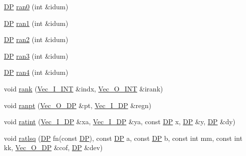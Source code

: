 \begin{DoxyCompactItemize}
\item 
\mbox{\hyperlink{namespaceNR_af6ff762dd605ff477b8e52387253a02a}{DP}} \mbox{\hyperlink{namespaceNR_a51fab0252d34144103c74d4f947e86c1}{ran0}} (int \&idum)
\item 
\mbox{\hyperlink{namespaceNR_af6ff762dd605ff477b8e52387253a02a}{DP}} \mbox{\hyperlink{namespaceNR_a6f5690957c136740f9dd29d51a3dc3fa}{ran1}} (int \&idum)
\item 
\mbox{\hyperlink{namespaceNR_af6ff762dd605ff477b8e52387253a02a}{DP}} \mbox{\hyperlink{namespaceNR_af14605dd4827bb94f49095d407b4fda7}{ran2}} (int \&idum)
\item 
\mbox{\hyperlink{namespaceNR_af6ff762dd605ff477b8e52387253a02a}{DP}} \mbox{\hyperlink{namespaceNR_a0e43557267c69b10738a862f546a0b2b}{ran3}} (int \&idum)
\item 
\mbox{\hyperlink{namespaceNR_af6ff762dd605ff477b8e52387253a02a}{DP}} \mbox{\hyperlink{namespaceNR_aa022fd357d369cb205d0dd59f0e2018a}{ran4}} (int \&idum)
\item 
void \mbox{\hyperlink{namespaceNR_af609478dc8d3d58e4d09f1f8f8553238}{rank}} (\mbox{\hyperlink{namespaceNR_ae67ce7dc86a8a64a7ce73c3c030ff610}{Vec\+\_\+\+I\+\_\+\+I\+NT}} \&indx, \mbox{\hyperlink{namespaceNR_ade2338f6d53b7da3dd6d1c04804541f2}{Vec\+\_\+\+O\+\_\+\+I\+NT}} \&irank)
\item 
void \mbox{\hyperlink{namespaceNR_a103ce563920343003034206a38ebdbb7}{ranpt}} (\mbox{\hyperlink{namespaceNR_a970094d23441f8ef6a45282a7eb2103d}{Vec\+\_\+\+O\+\_\+\+DP}} \&pt, \mbox{\hyperlink{namespaceNR_a9f943da53862537c552e2a770cb170ae}{Vec\+\_\+\+I\+\_\+\+DP}} \&regn)
\item 
void \mbox{\hyperlink{namespaceNR_acf23dccda6fe2ebd6630856bdb24a274}{ratint}} (\mbox{\hyperlink{namespaceNR_a9f943da53862537c552e2a770cb170ae}{Vec\+\_\+\+I\+\_\+\+DP}} \&xa, \mbox{\hyperlink{namespaceNR_a9f943da53862537c552e2a770cb170ae}{Vec\+\_\+\+I\+\_\+\+DP}} \&ya, const \mbox{\hyperlink{namespaceNR_af6ff762dd605ff477b8e52387253a02a}{DP}} x, \mbox{\hyperlink{namespaceNR_af6ff762dd605ff477b8e52387253a02a}{DP}} \&y, \mbox{\hyperlink{namespaceNR_af6ff762dd605ff477b8e52387253a02a}{DP}} \&dy)
\item 
void \mbox{\hyperlink{namespaceNR_a140701eacca3a2e031e077e8efc7794c}{ratlsq}} (\mbox{\hyperlink{namespaceNR_af6ff762dd605ff477b8e52387253a02a}{DP}} fn(const \mbox{\hyperlink{namespaceNR_af6ff762dd605ff477b8e52387253a02a}{DP}}), const \mbox{\hyperlink{namespaceNR_af6ff762dd605ff477b8e52387253a02a}{DP}} a, const \mbox{\hyperlink{namespaceNR_af6ff762dd605ff477b8e52387253a02a}{DP}} b, const int mm, const int kk, \mbox{\hyperlink{namespaceNR_a970094d23441f8ef6a45282a7eb2103d}{Vec\+\_\+\+O\+\_\+\+DP}} \&cof, \mbox{\hyperlink{namespaceNR_af6ff762dd605ff477b8e52387253a02a}{DP}} \&dev)

\end{DoxyCompactItemize}
